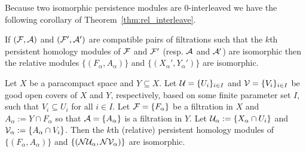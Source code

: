 Because two isomorphic persistence modules are $0$-interleaved we have the following corollary of Theorem~\ref{thm:rel_interleave}.

\begin{corollary}\label{cor:rel_interleave_iso}
  If $(\mathcal{F}, \mathcal{A})$ and $(\mathcal{F}', \mathcal{A}')$ are compatible pairs of filtrations such that the $k$th persistent homology modules of $\mathcal{F}$ and $\mathcal{F}'$ (resp. $\mathcal{A}$ and $\mathcal{A}'$) are isomorphic then the relative modules $\{(F_\alpha, A_\alpha)\}$ and $\{(X_\alpha', Y_\alpha')\}$ are isomorphic.
\end{corollary}

\begin{lemma}
  Let $X$ be a paracompact space and $Y\subseteq X$.
  Let $\mathcal{U} = \{U_i\}_{i\in I}$ and $\mathcal{V} = \{V_i\}_{i\in I}$ be good open covers of $X$ and $Y$, respectively, based on some finite parameter set $I$, such that $V_i\subseteq U_i$ for all $i\in I$.
  Let $\mathcal{F} = \{F_\alpha\}$ be a filtration in $X$ and $A_\alpha := Y\cap F_\alpha$ so that $\mathcal{A} = \{A_\alpha\}$ is a filtration in $Y$.
  Let $\mathcal{U}_\alpha := \{X_\alpha\cap U_i\}$ and $\mathcal{V}_\alpha := \{A_\alpha\cap V_i\}$.
  Then the $k$th (relative) persistent homology modules of $\{(F_\alpha, A_\alpha)\}$ and $\{(\mathcal{N}\mathcal{U}_\alpha, \mathcal{N}\mathcal{V}_\alpha)\}$ are isomorphic.
\end{lemma}
